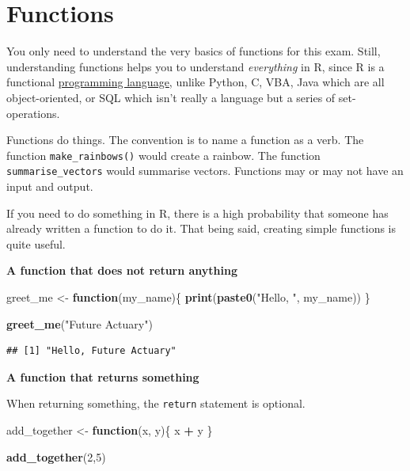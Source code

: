\documentclass[]{book}
\newenvironment{Shaded}{\begin{snugshade}}{\end{snugshade}}
\newcommand{\ControlFlowTok}[1]{\textcolor[rgb]{0.13,0.29,0.53}{\textbf{#1}}}
\newcommand{\DecValTok}[1]{\textcolor[rgb]{0.00,0.00,0.81}{#1}}
\newcommand{\KeywordTok}[1]{\textcolor[rgb]{0.13,0.29,0.53}{\textbf{#1}}}
\newcommand{\NormalTok}[1]{#1}
\newcommand{\OperatorTok}[1]{\textcolor[rgb]{0.81,0.36,0.00}{\textbf{#1}}}
\newcommand{\StringTok}[1]{\textcolor[rgb]{0.31,0.60,0.02}{#1}}
\begin{document}
\hypertarget{functions}{%
\section{Functions}\label{functions}}

You only need to understand the very basics of functions for this exam. Still, understanding functions helps you to understand \emph{everything} in R, since R is a functional \href{http://adv-r.had.co.nz/Functional-programming.html}{programming language}, unlike Python, C, VBA, Java which are all object-oriented, or SQL which isn't really a language but a series of set-operations.

Functions do things. The convention is to name a function as a verb. The function \texttt{make\_rainbows()} would create a rainbow. The function \texttt{summarise\_vectors} would summarise vectors. Functions may or may not have an input and output.

If you need to do something in R, there is a high probability that someone has already written a function to do it. That being said, creating simple functions is quite useful.

\textbf{A function that does not return anything}

\begin{Shaded}
\begin{Highlighting}[]
\NormalTok{greet_me <-}\StringTok{ }\ControlFlowTok{function}\NormalTok{(my_name)\{}
  \KeywordTok{print}\NormalTok{(}\KeywordTok{paste0}\NormalTok{(}\StringTok{"Hello, "}\NormalTok{, my_name))}
\NormalTok{\}}

\KeywordTok{greet_me}\NormalTok{(}\StringTok{"Future Actuary"}\NormalTok{)}
\end{Highlighting}
\end{Shaded}

\begin{verbatim}
## [1] "Hello, Future Actuary"
\end{verbatim}

\textbf{A function that returns something}

When returning something, the \texttt{return} statement is optional.

\begin{Shaded}
\begin{Highlighting}[]
\NormalTok{add_together <-}\StringTok{ }\ControlFlowTok{function}\NormalTok{(x, y)\{}
\NormalTok{  x }\OperatorTok{+}\StringTok{ }\NormalTok{y}
\NormalTok{\}}

\KeywordTok{add_together}\NormalTok{(}\DecValTok{2}\NormalTok{,}\DecValTok{5}\NormalTok{)}
\end{Highlighting}
\end{Shaded}
\end{document}
